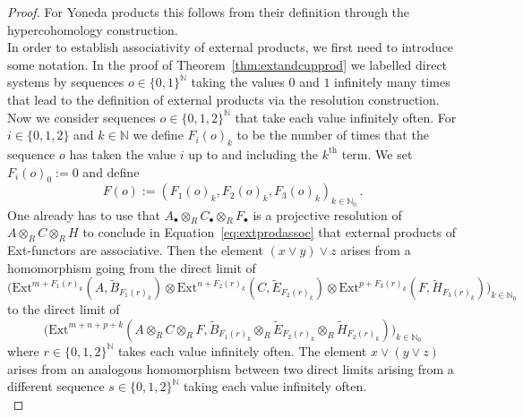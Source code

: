 \documentclass[12pt, a4paper]{article}
\numberwithin{equation}{section}
\theoremstyle{empty}
\theoremstyle{nonumberplain}
\newtheorem{proof}{Proof}
\begin{document}
\begin{proof}
For Yoneda products this follows from their definition through the hypercohomology construction. \\

In order to establish associativity of external products, we first need to introduce some notation. In the proof of Theorem~\ref{thm:extandcupprod} we labelled direct systems by sequences $o \in \lbrace 0, 1 \rbrace^{\mathbb{N}}$ taking the values $0$ and $1$ infinitely many times that lead to the definition of external products via the resolution construction. Now we consider sequences $o \in \lbrace 0, 1, 2 \rbrace^{\mathbb{N}}$ that take each value infinitely often. For $i \in \lbrace 0, 1, 2 \rbrace$ and $k \in \mathbb{N}$ we define $F_i(o)_k$ to be the number of times that the sequence $o$ has taken the value $i$ up to and including the $k^{\text{th}}$ term. We set $F_i(o)_0 := 0$ and define
\[ F(o) := (F_1(o)_k, F_2(o)_k, F_3(o)_k)_{k \in \mathbb{N}_0} \, . \]
One already has to use that $A_{\bullet} \otimes_R C_{\bullet} \otimes_R F_{\bullet}$ is a projective resolution of $A \otimes_R C \otimes_R H$ to conclude in Equation~\ref{eq:extprodassoc} that external products of Ext-functors are associative. Then the element $(x \vee y) \vee z$ arises from a homomorphism going from the direct limit of
\begin{equation}\label{eq:tripletensorfirst}
\big(\mathrm{Ext}^{m+F_1(r)_k}(A, \widetilde{B}_{F_1(r)_k}) \otimes \mathrm{Ext}^{n+F_2(r)_k}(C, \widetilde{E}_{F_2(r)_k}) \otimes \mathrm{Ext}^{p+F_3(r)_k}(F, \widetilde{H}_{F_3(r)_k})\big)_{k \in \mathbb{N}_0}
\end{equation}
to the direct limit of
\begin{equation}\label{eq:tripletensorsecond}
\big(\mathrm{Ext}^{m+n+p+k}(A \otimes_R C \otimes_R F, \widetilde{B}_{F_1(r)_k} \otimes_R \widetilde{E}_{F_2(r)_k} \otimes_R \widetilde{H}_{F_2(r)_k}) \big)_{k \in \mathbb{N}_0}
\end{equation}
where $r \in \lbrace 0, 1, 2 \rbrace^{\mathbb{N}}$ takes each value infinitely often. The element $x \vee (y \vee z)$ arises from an analogous homomorphism between two direct limits arising from a different sequence $s \in \lbrace 0, 1, 2 \rbrace^{\mathbb{N}}$ taking each value infinitely often. \\


\end{proof}
\end{document}
